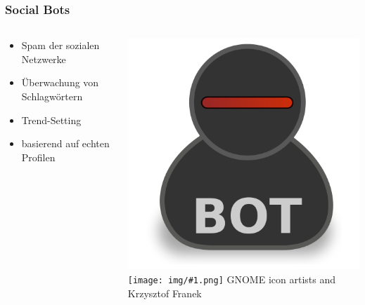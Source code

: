 \documentclass[12pt]{beamer}
\newcommand{\cc}[1]{\texttt{[image: img/\#1.png]}\hspace{1mm}}
\begin{document}
\begin{frame}
  \frametitle{Social Bots}
  \begin{columns}
    \begin{column}{0.7 \textwidth}
      \begin{itemize}
        \item<2-> Spam der sozialen Netzwerke
        \item<3-> Überwachung von Schlagwörtern
        \item<4-> Trend-Setting
        \item<5-> basierend auf echten Profilen
      \end{itemize}
    \end{column}
    \begin{column}{0.3 \textwidth}
      \begin{center}
        \includegraphics[width=\textwidth]{img/bot.png} \\
        \tiny \cc{by-sa} GNOME icon artists and Krzysztof Franek
      \end{center}
    \end{column}
  \end{columns}
\end{frame}
\end{document}
